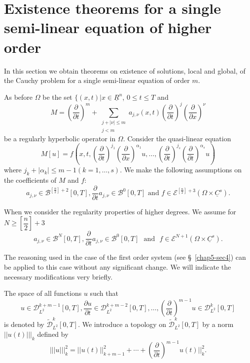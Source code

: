 \section[Existence theorems for a single semi-linear.....]{Existence
  theorems for a single semi-linear equation of higher
  order}\label{chap5-sec5}%

In this section we obtain theorems on existence of solutions, local
and global, of the Cauchy problem for a single semi-linear equation of
order $m$.  

As before $\Omega$ be the set $\{ (x, t) | x \in
\underline{R}^n$, $0 \leq t \leq T$ and  
\begin{equation*}
 M = \left(\frac{\partial}{\partial t}\right)^m + \sum_{\substack{j +
     |\nu | \leq m \\j < m }} a_{j, \nu} (x,
 t)\left(\frac{\partial}{\partial t}\right)^j 
 \left(\frac{\partial}{\partial x}\right)^\nu \tag{5.1}\label{chap5-eq5.1} 
\end{equation*}\pageoriginale
be a regularly hyperbolic operator in $\Omega$. Consider the quasi-linear
equation 
\begin{equation*}
M[u] = f\left(x, t, \left(\frac{\partial}{\partial
  t}\right)^{j_1}\left(\frac{\partial}{\partial
  x}\right)^{\alpha_1} u, \ldots, 
\left(\frac{\partial }{\partial t}\right)^{j_s} \left(\frac{\partial }{\partial
  t}\right)^{\alpha_s}u\right) \tag{5.2}\label{chap5-eq5.2}
\end{equation*}
where $j_k + |\alpha _k| \leq m-1 (k = 1,  \ldots,  s)$. We make the
following assumptions on the coefficients of $M$ and $f$: 
$$
a_{j,\nu} \in \mathscr{B}^{[\frac{n}{2}]+2}[0, T],
\frac{\partial} {\partial t} a_{j,\nu}  \in \mathscr{B}^0 [ 0, T]
\text{ and } f \in \mathscr{E}^{ [\frac{n}{2}]+3} (\Omega
\times \underline{C}^s).  
$$ 

When we consider the regularity properties of higher degrees. We
assume for $N \geq [\dfrac{n}{2}] + 3$  
$$
a_{j, \nu} \in \mathscr{B}^N  [0, T], \frac{\partial}{\partial
  t} a_{j, \nu} \in \mathscr{B}^0 [0, T] \text{~ and~ } 
f \in \mathscr{E}^{N+1}(\Omega \times \underline{C}^s).  
$$

The reasoning used in the case of the first order system (see
\S\ \ref{chap5-sec4}) 
can be applied to this case without any significant change. We will
indicate the necessary modifications very briefly.  

The space of all functions $u$ such that 
$$
u \in \mathscr{D}^{k + m-1}_{L^2} [0, T], \frac{\partial
  u}{\partial t} \in \mathscr{D}^{k+m-2}_{L^2} [0, T], \ldots, 
\left(\frac{\partial}{\partial t}\right)^{m-1} u \in
\mathscr{D}^{k}_{L^2} [0, T]   
$$
is denoted by $\tilde{\mathscr{D}}^k_{L^2} [0, T]$. We introduce a
topology on $\tilde{\mathscr{D}}^k_{L^2} [0, T]$ by a norm $|| u (t)
|||_k$ defined by  
\begin{equation*}
||| u |||^2_k = || u (t)||^2_{k+m-1} + \cdots +
\left(\frac{\partial}{\partial t}\right)^{m-1} u (t)||^2_k.
\tag{5.3}\label{chap5-eq5.3} 
\end{equation*}

